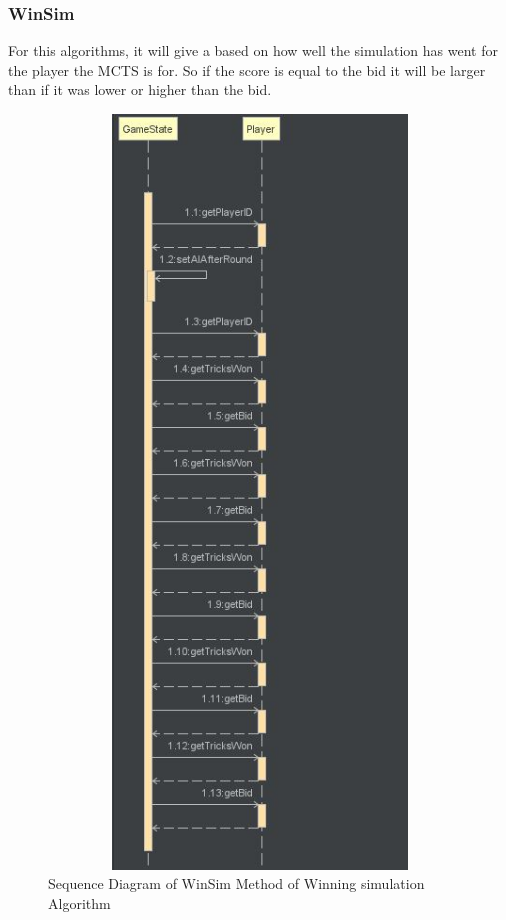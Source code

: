 \subsubsection{WinSim}
For this algorithms, it will give a based on how well the simulation has went for the player the MCTS is for. So if the score is equal to the bid it will be larger than if it was lower or higher than the bid.
\begin{figure}
\centering
\includegraphics[width=15cm ,height=20cm,keepaspectratio]{WinSimSequenceDiagram}
\caption{Sequence Diagram of WinSim Method of Winning simulation Algorithm }
\label{fig:WinSim}
\end{figure}
